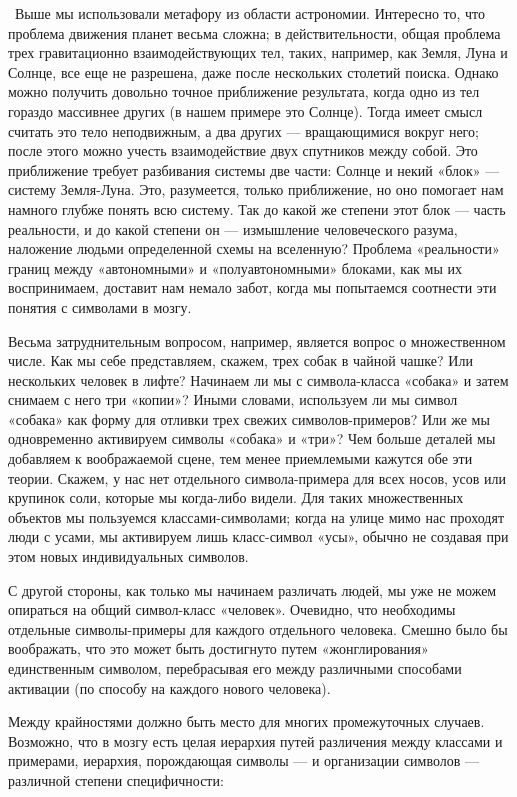 \documentclass[../main.tex]{subfiles}
\begin{document}
~Выше мы использовали метафору из области астрономии. Интересно то, что проблема движения планет весьма сложна; в действительности, общая проблема трех гравитационно взаимодействующих тел, таких, например, как Земля, Луна и Солнце, все еще не разрешена, даже после нескольких столетий поиска. Однако можно получить довольно точное приближение результата, когда одно из тел гораздо массивнее других (в нашем примере это Солнце). Тогда имеет смысл считать это тело неподвижным, а два других --- вращающимися вокруг него; после этого можно учесть взаимодействие двух спутников между собой. Это приближение требует разбивания системы две части: Солнце и некий «блок» --- систему Земля-Луна. Это, разумеется, только приближение, но оно помогает нам намного глубже понять всю систему. Так до какой же степени этот блок --- часть реальности, и до какой степени он --- измышление человеческого разума, наложение людьми определенной схемы на вселенную? Проблема «реальности» границ между «автономными» и «полуавтономными» блоками, как мы их воспринимаем, доставит нам немало забот, когда мы попытаемся соотнести эти понятия с символами в мозгу.

Весьма затруднительным вопросом, например, является вопрос о множественном числе. Как мы себе представляем, скажем, трех собак в чайной чашке? Или нескольких человек в лифте? Начинаем ли мы с символа-класса «собака» и затем снимаем с него три «копии»? Иными словами, используем ли мы символ «собака» как форму для отливки трех свежих символов-примеров? Или же мы одновременно активируем символы «собака» и «три»? Чем больше деталей мы добавляем к воображаемой сцене, тем менее приемлемыми кажутся обе эти теории. Скажем, у нас нет отдельного символа-примера для всех носов, усов или крупинок соли, которые мы когда-либо видели. Для таких множественных объектов мы пользуемся классами-символами; когда на улице мимо нас проходят люди с усами, мы активируем лишь класс-символ «усы», обычно не создавая при этом новых индивидуальных символов.

С другой стороны, как только мы начинаем различать людей, мы уже не можем опираться на общий символ-класс «человек». Очевидно, что необходимы отдельные символы-примеры для каждого отдельного человека. Смешно было бы воображать, что это может быть достигнуто путем «жонглирования» единственным символом, перебрасывая его между различными способами активации (по способу на каждого нового человека).

Между крайностями должно быть место для многих промежуточных случаев. Возможно, что в мозгу есть целая иерархия путей различения между классами и примерами, иерархия, порождающая символы --- и организации символов --- различной степени специфичности:
\end{document}

